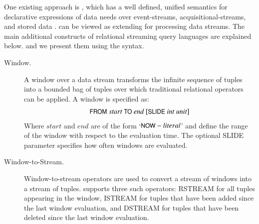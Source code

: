 One existing approach is \sneeql, which has a well defined, unified semantics for declarative expressions of data needs over event-streams, acquisitional-streams, and stored data \cite{Brenninkmeijer_08}.
\sneeql can be viewed as extending \sql for processing data streams.
The main additional constructs of relational streaming query languages are explained below. and we present them using the \sneeql syntax. 
\begin{description}
\item[Window.] A window over a data stream transforms the infinite sequence of tuples into a bounded bag of tuples over which traditional relational operators can be applied. A window is specified as: 
\begin{align*}
\textsf{\small{FROM}}\ {start}\ \textsf{\small{TO}}\ {end}\ [\textsf{\small{SLIDE}}\ {int}\ {unit}]
\end{align*}
Where ${start}$ and ${end}$ are of the form `$\textsf{\small{NOW}} - {literal}$' and define the range of the window with respect to the evaluation time. The optional \textsf{\small{SLIDE}} parameter specifies how often windows are evaluated.

\item[Window-to-Stream.] Window-to-stream operators are used to convert a stream of windows into a stream of tuples. \sneeql supports three such operators: \textsf{\small{RSTREAM}} for all tuples appearing in the window, \textsf{\small{ISTREAM}} for tuples that have been added since the last window evaluation, and \textsf{\small{DSTREAM}} for tuples that have been deleted since the last window evaluation.
\end{description}



